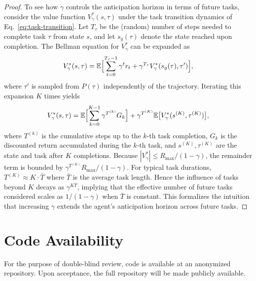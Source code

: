 \documentclass{article}
\begin{document}
\begin{proof}
To see how $\gamma$ controls the anticipation horizon in terms of future tasks, consider the value function $V^*_\gamma(s,\tau)$ under the task transition dynamics of Eq.~\eqref{eq:task-transition}. Let $T_\tau$ be the (random) number of steps needed to complete task $\tau$ from state $s$, and let $s_g(\tau)$ denote the state reached upon completion. The Bellman equation for $V^*_\gamma$ can be expanded as
\[
V^*_\gamma(s,\tau)=\mathbb{E}\Bigl[\sum_{t=0}^{T_\tau-1}\gamma^t r_t + \gamma^{T_\tau} V^*_\gamma(s_g(\tau),\tau')\Bigr],
\]
where $\tau'$ is sampled from $P(\tau)$ independently of the trajectory. Iterating this expansion $K$ times yields
\[
V^*_\gamma(s,\tau)=\mathbb{E}\Bigl[\sum_{k=0}^{K-1}\gamma^{T^{(k)}}G_k\Bigr]+\gamma^{T^{(K)}}\mathbb{E}\bigl[V^*_\gamma(s^{(K)},\tau^{(K)})\bigr],
\]
where $T^{(k)}$ is the cumulative steps up to the $k$-th task completion, $G_k$ is the discounted return accumulated during the $k$-th task, and $s^{(K)},\tau^{(K)}$ are the state and task after $K$ completions. Because $|V^*_\gamma| \le R_{\max}/(1-\gamma)$, the remainder term is bounded by $\gamma^{T^{(K)}}R_{\max}/(1-\gamma)$. For typical task durations, $T^{(K)} \approx K \cdot \bar{T}$ where $\bar{T}$ is the average task length. Hence the influence of tasks beyond $K$ decays as $\gamma^{K\bar{T}}$, implying that the effective number of future tasks considered scales as $1/(1-\gamma)$ when $\bar{T}$ is constant. This formalizes the intuition that increasing $\gamma$ extends the agent's anticipation horizon across future tasks.
\end{proof}

\section*{Code Availability}
For the purpose of double-blind review, code is available at an anonymized repository. Upon acceptance, the full repository will be made publicly available.

\clearpage
{}
\label{sec:refs}


\end{document}
